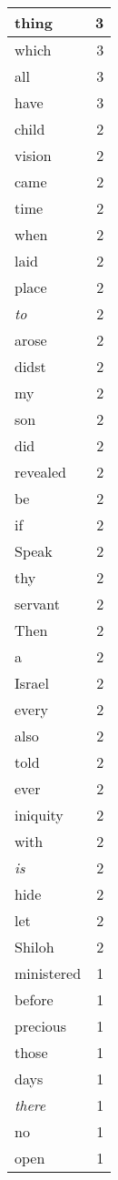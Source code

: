 \begin{center}
\begin{longtable}{l|r}
thing & 3 \\ \hline
which & 3 \\ \hline
all & 3 \\ \hline
have & 3 \\ \hline
child & 2 \\ \hline
vision & 2 \\ \hline
came & 2 \\ \hline
time & 2 \\ \hline
when & 2 \\ \hline
laid & 2 \\ \hline
place & 2 \\ \hline
\emph{to} & 2 \\ \hline
arose & 2 \\ \hline
didst & 2 \\ \hline
my & 2 \\ \hline
son & 2 \\ \hline
did & 2 \\ \hline
revealed & 2 \\ \hline
be & 2 \\ \hline
if & 2 \\ \hline
Speak & 2 \\ \hline
thy & 2 \\ \hline
servant & 2 \\ \hline
Then & 2 \\ \hline
a & 2 \\ \hline
Israel & 2 \\ \hline
every & 2 \\ \hline
also & 2 \\ \hline
told & 2 \\ \hline
ever & 2 \\ \hline
iniquity & 2 \\ \hline
with & 2 \\ \hline
\emph{is} & 2 \\ \hline
hide & 2 \\ \hline
let & 2 \\ \hline
Shiloh & 2 \\ \hline
ministered & 1 \\ \hline
before & 1 \\ \hline
precious & 1 \\ \hline
those & 1 \\ \hline
days & 1 \\ \hline
\emph{there} & 1 \\ \hline
no & 1 \\ \hline
open & 1 \\ \hline

\end{longtable}
\end{center}
